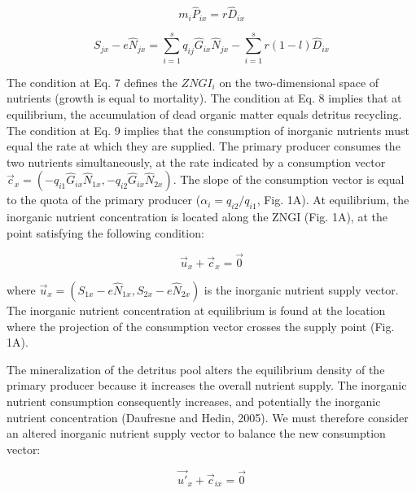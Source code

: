\documentclass[12pt]{paper}
\begin{document}
\begin{equation}
	\label{e:bnet}
	m_{i}\widehat{P}_{ix}=r\widehat{D}_{ix} 
\end{equation}

\begin{equation}
	\label{e:bnet}
	S_{jx}-e\widehat{N}_{jx}=\sum_{i=1}^{s}q_{ij}\widehat{G}_{ix}\widehat{N}_{jx}-\sum_{i=1}^{s}r(1-l)\widehat{D}_{ix}
\end{equation}

The condition at Eq. 7 defines the $ZNGI_i$ on the two-dimensional space of nutrients (growth is equal to mortality). The condition at Eq. 8 implies that at equilibrium, the accumulation of dead organic matter equals detritus recycling. The condition at Eq. 9 implies that the consumption of inorganic nutrients must equal the rate at which they are supplied. The primary producer consumes the two nutrients simultaneously, at the rate indicated by a consumption vector $\overrightarrow{c}_{x} = (-q_{i1}\widehat{G}_{ix}\widehat{N}_{1x},-q_{i2}\widehat{G}_{ix}\widehat{N}_{2x})$. The slope of the consumption vector is equal to the quota of the primary producer ($\alpha_{i}=q_{i2}/q_{i1}$, Fig. 1A). At equilibrium, the inorganic nutrient concentration is located along the ZNGI (Fig. 1A), at the point satisfying the following condition:

\begin{equation}
	\label{e:bnet}
	\overrightarrow{u}_{x}+\overrightarrow{c}_{x}=\overrightarrow{0}
\end{equation}		 	

where $\overrightarrow{u}_{x}=(S_{1x}-e\widehat{N}_{1x},S_{2x}-e\widehat{N}_{2x})$ is the inorganic nutrient supply vector. The inorganic nutrient concentration at equilibrium is found at the location where the projection of the consumption vector crosses the supply point (Fig. 1A). 

	The mineralization of the detritus pool alters the equilibrium density of the primary producer because it increases the overall nutrient supply. The inorganic nutrient consumption consequently increases, and potentially the inorganic nutrient concentration (Daufresne and Hedin, 2005). We must therefore consider an altered inorganic nutrient supply vector to balance the new consumption vector:

\begin{equation}
	\label{e:bnet}
	\overrightarrow{u'}_{x}+\overrightarrow{c}_{ix}=\overrightarrow{0}
\end{equation}
\end{document}
